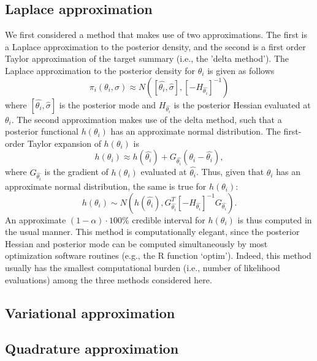 \documentclass{article}
\begin{document}
\subsection{Laplace approximation}
We first considered a method that makes use of two approximations. The first is a Laplace approximation to the posterior density, and the second is a first order Taylor approximation of the target summary (i.e., the 'delta method'). The Laplace approximation to the posterior density for $\theta_i$ is given as follows
\begin{displaymath}
\pi_i(\theta_i, \sigma) \approx N([\hat{\theta_i},\hat{\sigma}], [-H_{\hat{\theta_i}}]^{-1})
\end{displaymath} 
\noindent where $[\hat{\theta_i},\hat{\sigma}]$ is the posterior mode and $H_{\hat{\theta_i}}$ is the posterior Hessian evaluated at $\theta_i$. The second approximation makes use of the delta method, such that a posterior functional $h(\theta_i)$ has an approximate normal distribution. The first-order Taylor expansion of $h(\theta_i)$ is 
\begin{displaymath}
h(\theta_i) \approx  h(\hat{\theta_i}) + G_{\hat{\theta_i}}(\theta_i - \hat{\theta_i}),
\end{displaymath}
\noindent where $G_{\hat{\theta_i}}$ is the gradient of $h(\theta_i)$ evaluated at $\hat{\theta_i}$. Thus, given that $\theta_i$ has an approximate normal distribution, the same is true for $h(\theta_i)$:
\begin{displaymath}
h(\theta_i) \sim N(h(\hat{\theta_i}), G^T_{\hat{\theta_i}}[-H_{\hat{\theta_i}}]^{-1}G_{\hat{\theta_i}}). 
\end{displaymath}
\noindent An approximate $(1-\alpha)\cdot 100$\% credible interval for $h(\theta_i)$ is thus computed in the usual manner. This method is computationally elegant, since the posterior Hessian and posterior mode can be computed simultaneously by most optimization software routines (e.g., the R function `optim'). Indeed, this method usually has the smallest computational burden (i.e., number of likelihood evaluations) among the three methods considered here.

\subsection{Variational approximation}
\subsection{Quadrature approximation}
\end{document}
